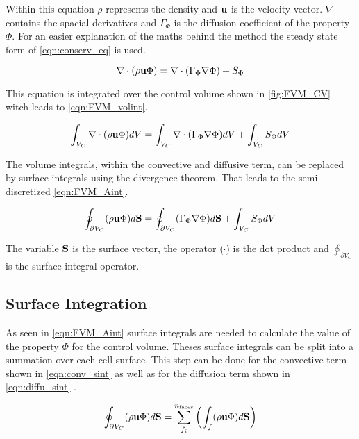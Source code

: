 \documentclass[../thesis.tex]{subfiles}
\begin{document}
Within this equation $ \rho $ represents the density and $ \bold{u} $ is the velocity vector. $ \nabla $ contains the spacial derivatives and $ \Gamma_\Phi $ is the diffusion coefficient of the property $ \Phi $.
For an easier explanation of the maths behind the method the steady state form of \autoref{eqn:conserv_eq} is used.

\begin{equation}
	\nabla \cdot (\rho \bold{u} \Phi) = \nabla \cdot (\Gamma_\Phi \nabla \Phi) + S_\Phi
\end{equation}

This equation is integrated over the control volume shown in \autoref{fig:FVM_CV} witch leads to \autoref{eqn:FVM_volint}.

\begin{equation}
	\label{eqn:FVM_volint}
	\int_{V_C} \nabla \cdot (\rho \bold{u} \Phi) dV = \int_{V_C} \nabla \cdot (\Gamma_\Phi \nabla \Phi) dV + \int_{V_C} S_\Phi dV
\end{equation}

The volume integrals, within the convective and diffusive term, can be replaced by surface integrals using the divergence theorem. That leads to the semi-discretized \autoref{eqn:FVM_Aint}.

\begin{equation}
	\label{eqn:FVM_Aint}
	\oint_{\partial V_C} (\rho \bold{u} \Phi) d\bold{S} = \oint_{\partial V_C} (\Gamma_\Phi \nabla \Phi) d\bold{S} + \int_{V_C} S_\Phi dV
\end{equation}

The variable $ \bold{S}$ is the surface vector, the operator ($\cdot$) is the dot product and $ \oint_{\partial V_C}$ is the surface integral operator.

\subsection{Surface Integration}

As seen in \autoref{eqn:FVM_Aint} surface integrals are needed to calculate the value of the property $\Phi$ for the control volume. Theses surface integrals can be split into a summation over each cell surface. This step can be done for the convective term shown in \autoref{eqn:conv_sint} as well as for the diffusion term shown in \autoref{eqn:diffu_sint} \cite{darwish2021finite}.

\begin{equation}
	\label{eqn:conv_sint}
	\oint_{\partial V_C} (\rho \bold{u} \Phi) d\bold{S} = \sum_{f_i}^{n_{\text{faces}}}\left( \int_{f} (\rho \bold{u} \Phi) d\bold{S} \right)
\end{equation}
\end{document}
